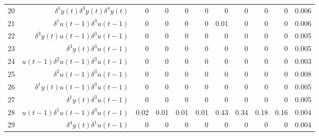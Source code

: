 \begin{tabular}{rrrrrrrrrrr}
20 & $\delta^1 y(t)\delta^3 y(t)\delta^4 y(t)$ & 0 & 0 & 0 & 0 & 0 & 0 & 0 & 0 & 0.006 \\ 
21 & $\delta^1 u(t-1)\delta^3 u(t-1)$ & 0 & 0 & 0 & 0 & 0.01 & 0 & 0 & 0 & 0.006 \\ 
22 & $\delta^3 y(t)u(t-1)\delta^3 u(t-1)$ & 0 & 0 & 0 & 0 & 0 & 0 & 0 & 0 & 0.005 \\ 
23 & $\delta^3 y(t)\delta^3 u(t-1)$ & 0 & 0 & 0 & 0 & 0 & 0 & 0 & 0 & 0.005 \\ 
24 & $u(t-1)\delta^2 u(t-1)\delta^3 u(t-1)$ & 0 & 0 & 0 & 0 & 0 & 0 & 0 & 0 & 0.003 \\ 
25 & $\delta^2 u(t-1)\delta^3 u(t-1)$ & 0 & 0 & 0 & 0 & 0 & 0 & 0 & 0 & 0.008 \\ 
26 & $\delta^1 y(t)u(t-1)\delta^3 u(t-1)$ & 0 & 0 & 0 & 0 & 0 & 0 & 0 & 0 & 0.005 \\ 
27 & $\delta^1 y(t)\delta^3 u(t-1)$ & 0 & 0 & 0 & 0 & 0 & 0 & 0 & 0 & 0.005 \\ 
28 & $u(t-1)\delta^1 u(t-1)\delta^3 u(t-1)$ & 0.02 & 0.01 & 0.01 & 0.01 & 0.43 & 0.34 & 0.18 & 0.16 & 0.004 \\ 
29 & $\delta^4 y(t)\delta^1 u(t-1)$ & 0 & 0 & 0 & 0 & 0 & 0 & 0 & 0 & 0.004 \\ 
\hline 
\end{tabular}